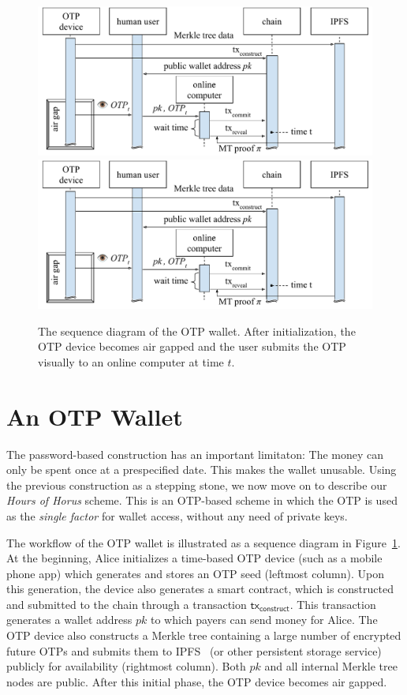 \begin{figure}[ht]
    \caption{The sequence diagram of the OTP wallet. After initialization, the OTP device
             becomes air gapped and the user submits the OTP visually to an online computer
             at time $t$.}
    \centering
    \iflncs
        \includegraphics[width=\textwidth,keepaspectratio]{figures/otp-sequence-diagram.pdf}
    \else
        \includegraphics[width=0.7 \textwidth,keepaspectratio]{figures/otp-sequence-diagram.pdf}
    \fi
    \label{fig.sequence-diagram}
\end{figure}

\section{An OTP Wallet}

The password-based construction has an important limitaton:
The money can only be spent once at a prespecified date. This makes
the wallet unusable.
Using the previous construction as a stepping stone,
we now move on to describe our \emph{Hours of Horus} scheme.
This is an OTP-based scheme in which the OTP is used as the \emph{single factor}
for wallet access, without any need of private keys.

The workflow of the OTP wallet is illustrated as a sequence diagram
in Figure~\ref{fig.sequence-diagram}. At the beginning, Alice initializes
a time-based OTP device (such as a mobile phone app) which
generates and stores an OTP seed (leftmost column). Upon this generation, the device also
generates a smart contract, which is constructed and submitted to the chain
through a transaction $\textsf{tx}_\textsf{construct}$.
This transaction generates a wallet address $pk$ to which
payers can send money for Alice. The OTP device also constructs a Merkle tree containing
a large number of encrypted future OTPs and submits them to IPFS~\cite{ipfs} (or other persistent storage service)
publicly for availability (rightmost column).
Both $pk$ and all internal Merkle tree nodes are public. After this
initial phase, the OTP device becomes air gapped.


